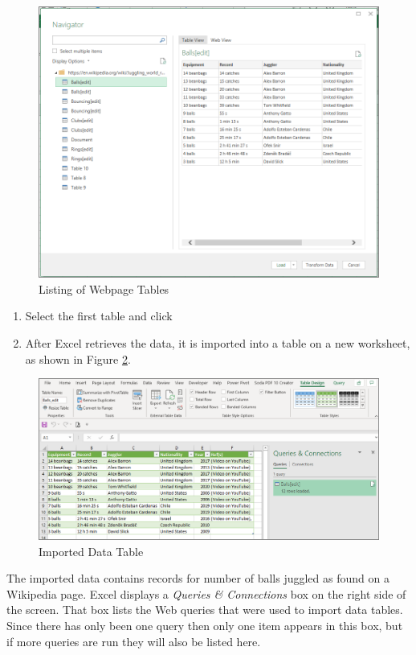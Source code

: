 \begin{figure}[H]
	\centering
	\includegraphics[width=\maxwidth{.95\linewidth}]{gfx/ch07_fig02b}
	\caption{Listing of Webpage Tables}
	\label{07:fig02b}
\end{figure}

\begin{enumerate}[resume]
	\item Select the first table and click 
	\item After Excel retrieves the data, it is imported into a table on a new worksheet, as shown in Figure \ref{07:fig02c}.
\end{enumerate}

\begin{figure}[H]
	\centering
	\includegraphics[width=\maxwidth{.95\linewidth}]{gfx/ch07_fig02c}
	\caption{Imported Data Table}
	\label{07:fig02c}
\end{figure}

The imported data contains records for number of balls juggled as found on a Wikipedia page. Excel displays a \textit{Queries \& Connections} box on the right side of the screen. That box lists the Web queries that were used to import data tables. Since there has only been one query then only one item appears in this box, but if more queries are run they will also be listed here. 


